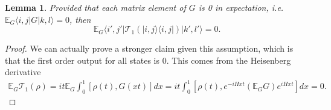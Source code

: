 \documentclass[
 amsmath,amssymb,
 aps,
onecolumn, 
nofootinbib]{revtex4-2}
\newtheorem{lemma}[theorem]{Lemma}
\newcommand{\ket}[1]{|#1\rangle}
\newcommand{\bra}[1]{\langle #1|}
\newcommand{\ketbra}[2]{| #1\rangle\! \langle #2|}
\newcommand{\EE}{\mathbb{E}}
\begin{document}
\begin{lemma}
    Provided that each matrix element of $G$ is 0 in expectation, i.e. $\EE_G \bra{i,j} G \ket{k,l} = 0$, then 
    \begin{equation}
        \EE_G \bra{i',j'} \mathcal{T}_1 (\ketbra{i,j}{i,j}) \ket{k',l'} = 0.
    \end{equation}
\end{lemma}
\begin{proof}
    We can actually prove a stronger claim given this assumption, which is that the first order output for all states is 0. This comes from the Heisenberg derivative 
    \begin{align}
        \EE_G \mathcal{T}_1(\rho) = i t \EE_G \int_0^1 [\rho(t), G(xt)] dx = i t \int_0^1 [\rho(t), e^{-i H x t} (\EE_G G ) e^{i H x t}] dx = 0.
    \end{align}
\end{proof}
\end{document}
